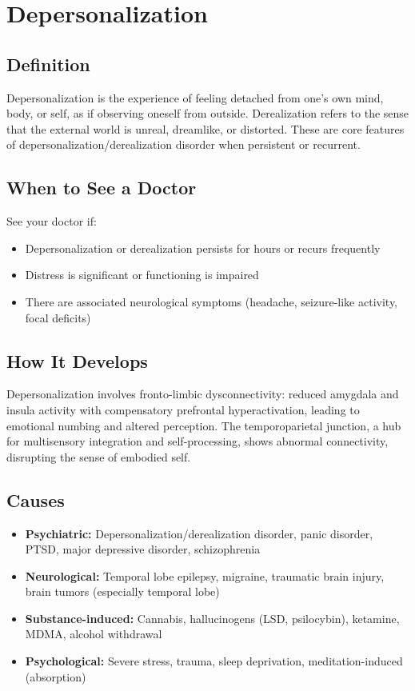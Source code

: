 \chapter{Depersonalization}

\section*{Definition}
Depersonalization is the experience of feeling detached from one's own mind, body, or self, as if observing oneself from outside. Derealization refers to the sense that the external world is unreal, dreamlike, or distorted. These are core features of depersonalization/derealization disorder when persistent or recurrent.

\section*{When to See a Doctor}
See your doctor if:
\begin{itemize}
  \item Depersonalization or derealization persists for hours or recurs frequently
  \item Distress is significant or functioning is impaired
  \item There are associated neurological symptoms (headache, seizure-like activity, focal deficits)
\end{itemize}

\section*{How It Develops}
Depersonalization involves fronto-limbic dysconnectivity: reduced amygdala and insula activity with compensatory prefrontal hyperactivation, leading to emotional numbing and altered perception. The temporoparietal junction, a hub for multisensory integration and self-processing, shows abnormal connectivity, disrupting the sense of embodied self.

\section*{Causes}
\begin{itemize}
  \item \textbf{Psychiatric:} Depersonalization/derealization disorder, panic disorder, PTSD, major depressive disorder, schizophrenia
  \item \textbf{Neurological:} Temporal lobe epilepsy, migraine, traumatic brain injury, brain tumors (especially temporal lobe)
  \item \textbf{Substance-induced:} Cannabis, hallucinogens (LSD, psilocybin), ketamine, MDMA, alcohol withdrawal
  \item \textbf{Psychological:} Severe stress, trauma, sleep deprivation, meditation-induced (absorption)
\end{itemize}

